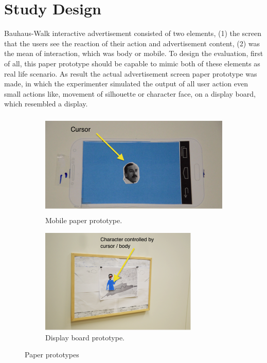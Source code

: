\section{Study Design}
Bauhaus-Walk interactive advertisement consisted of two elements, (1) the screen that the users see the reaction of their action and advertisement content, (2) was the mean of interaction, which was body or mobile. To design the evaluation, first of all, this paper prototype should be capable to mimic both of these elements as real life scenario. As result the actual advertisement screen paper prototype was made, in which the experimenter simulated the output of all user action even small actions like, movement of silhouette or character face, on a display board, which resembled a display.

\begin{figure}[H]
    \centering
    \begin{subfigure}[H]{0.48\textwidth}
        \centering
        \includegraphics[width=\textwidth,height=5cm]{Figures/5/mobile_paper}
        \caption{Mobile paper prototype.}
        \label{fig:mobileproto}
    \end{subfigure}
    \begin{subfigure}[H]{0.48\textwidth}
        \centering
        \includegraphics[width=\textwidth,height=5cm]{Figures/5/paper_board}
        \caption{Display board prototype.}
        \label{fig:screen_proto}
    \end{subfigure}
    \caption{Paper prototypes}
    \label{fig:paper_prototype_screen}
\end{figure}


